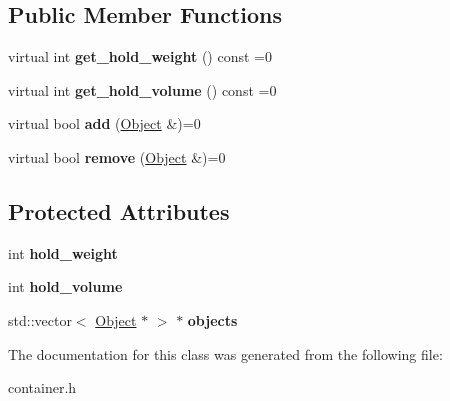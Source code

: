 \subsection*{Public Member Functions}
\begin{DoxyCompactItemize}
\item 
\hypertarget{classda__game_1_1Container_a8791f5bdac70b65d978ac0184ed48525}{
virtual int {\bfseries get\_\-hold\_\-weight} () const =0}
\label{classda__game_1_1Container_a8791f5bdac70b65d978ac0184ed48525}

\item 
\hypertarget{classda__game_1_1Container_a884311719474a432f186dfc803e15873}{
virtual int {\bfseries get\_\-hold\_\-volume} () const =0}
\label{classda__game_1_1Container_a884311719474a432f186dfc803e15873}

\item 
\hypertarget{classda__game_1_1Container_a37fab4911cc993db3f4e26c4e6e95eba}{
virtual bool {\bfseries add} (\hyperlink{classda__game_1_1Object}{Object} \&)=0}
\label{classda__game_1_1Container_a37fab4911cc993db3f4e26c4e6e95eba}

\item 
\hypertarget{classda__game_1_1Container_a8bb5c906abd5f6df854e6eab8831305e}{
virtual bool {\bfseries remove} (\hyperlink{classda__game_1_1Object}{Object} \&)=0}
\label{classda__game_1_1Container_a8bb5c906abd5f6df854e6eab8831305e}

\end{DoxyCompactItemize}
\subsection*{Protected Attributes}
\begin{DoxyCompactItemize}
\item 
\hypertarget{classda__game_1_1Container_ae00fef93faf3dd5a8535845d0e7f63a0}{
int {\bfseries hold\_\-weight}}
\label{classda__game_1_1Container_ae00fef93faf3dd5a8535845d0e7f63a0}

\item 
\hypertarget{classda__game_1_1Container_aae21247d0254a4e272065b6141795514}{
int {\bfseries hold\_\-volume}}
\label{classda__game_1_1Container_aae21247d0254a4e272065b6141795514}

\item 
\hypertarget{classda__game_1_1Container_ac06cad31bb04667d3fb88c2311422373}{
std::vector$<$ \hyperlink{classda__game_1_1Object}{Object} $\ast$ $>$ $\ast$ {\bfseries objects}}
\label{classda__game_1_1Container_ac06cad31bb04667d3fb88c2311422373}

\end{DoxyCompactItemize}


The documentation for this class was generated from the following file:\begin{DoxyCompactItemize}
\item 
container.h\end{DoxyCompactItemize}
